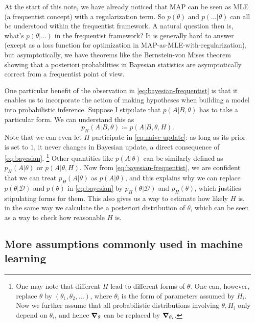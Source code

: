 \documentclass[hyperref, a4paper]{article}
\begin{document}
At the start of this note, we have already noticed that MAP can be seen as MLE (a frequentist concept) with a regularization term.
So $p(\theta)$ and $p(\dots | \theta)$ can all be understood within the frequentist framework.
A natural question then is, what's $p(\theta | \dots)$ in the frequentist framework?
It is generally hard to answer (except as a loss function for optimization in MAP-as-MLE-with-regularization), but asymptotically,
we have theorems like the Bernstein-von Mises theorem showing 
that a posteriori probabilities in Bayesian statistics are asymptotically correct from a frequentist point of view.

One particular benefit of the observation in \eqref{eq:bayesian-frequentist}
is that it enables us to incorporate the action of making hypotheses when building a model into probabilistic inference.
Suppose I stipulate that $p(A | B, \theta)$ has to take a particular form.
We can understand this as 
\begin{equation}
    p_H(A | B, \theta) \coloneqq p(A | B, \theta, H).
\end{equation}
Note that we can even let $H$ participate in \eqref{eq:naive-update}:
as long as its prior is set to $1$, it never changes in Bayesian update, a direct consequence of \eqref{eq:bayesian}.%
\footnote{
    One may note that different $H$ lead to different forms of $\theta$.
    One can, however, replace $\theta$ by $(\theta_1, \theta_2, \dots)$,
    where $\theta_i$ is the form of parameters assumed by $H_i$.
    Now we further assume that all probabilistic distributions involving $\theta, H_i$ only depend on $\theta_i$,
    and hence $\grad_\theta$ can be replaced by $\grad_{\theta_i}$.
}
Other quantities like $p(A | \theta)$ can be similarly defined as 
$p_H(A | \theta)$ or $p(A | \theta, H)$.
Now from \eqref{eq:bayesian-frequentist}, we are confident that we can treat $p_H(A | \theta)$ as $p(A | \theta)$,
and this explains why we can replace $p(\theta | \mathcal{D})$ and $p(\theta)$ in \eqref{eq:bayesian}
by $p_H(\theta | \mathcal{D})$ and $p_H(\theta)$,
which justifies stipulating forms for them.
This also gives us a way to estimate how likely $H$ is,
in the same way we calculate the a posteriori distribution of $\theta$,
which can be seen as a way to check how reasonable $H$ is.

\subsection{More assumptions commonly used in machine learning}
\end{document}

